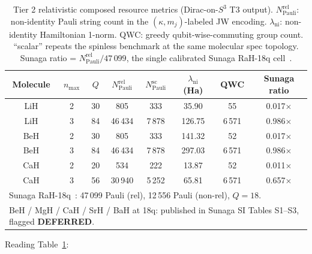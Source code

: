 \begin{table}[h]
\caption{Tier 2 relativistic composed resource metrics (Dirac-on-$S^3$
T3 output). $N_{\mathrm{Pauli}}^{\mathrm{rel}}$: non-identity Pauli
string count in the $(\kappa, m_j)$-labeled JW encoding. $\lambda_{\mathrm{ni}}$:
non-identity Hamiltonian 1-norm. QWC: greedy qubit-wise-commuting
group count. ``scalar'' repeats the spinless benchmark at the same
molecular spec topology. Sunaga ratio = $N_{\mathrm{Pauli}}^{\mathrm{rel}} / 47\,099$,
the single calibrated Sunaga RaH-18q cell~\cite{Sunaga2025}.}
\label{tab:paper20_tier2}
\begin{ruledtabular}
\begin{tabular}{cccccccc}
Molecule & $n_{\max}$ & $Q$ & $N_{\mathrm{Pauli}}^{\mathrm{rel}}$ & $N_{\mathrm{Pauli}}^{\mathrm{sc}}$ & $\lambda_{\mathrm{ni}}$ (Ha) & QWC & Sunaga ratio \\
\hline
LiH & 2 & 30 &    805  & 333    &  35.90 &   55 & 0.017$\times$ \\
LiH & 3 & 84 & 46\,434 & 7\,878 & 126.75 & 6\,571 & 0.986$\times$ \\
BeH & 2 & 30 &    805  & 333    & 141.32 &   52 & 0.017$\times$ \\
BeH & 3 & 84 & 46\,434 & 7\,878 & 297.03 & 6\,571 & 0.986$\times$ \\
CaH & 2 & 20 &    534  & 222    &  13.87 &   52 & 0.011$\times$ \\
CaH & 3 & 56 & 30\,940 & 5\,252 &  65.81 & 6\,571 & 0.657$\times$ \\
\hline\hline
\multicolumn{8}{l}{\footnotesize Sunaga RaH-18q~\cite{Sunaga2025}: 47\,099 Pauli (rel), 12\,556 Pauli (non-rel), $Q = 18$.} \\
\multicolumn{8}{l}{\footnotesize BeH / MgH / CaH / SrH / BaH at 18q: published in Sunaga SI Tables S1--S3, flagged \textbf{DEFERRED}.} \\
\end{tabular}
\end{ruledtabular}
\end{table}

Reading Table~\ref{tab:paper20_tier2}:

